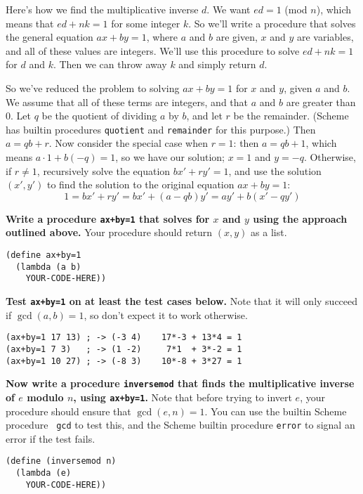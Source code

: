 Here's how we find the multiplicative inverse $d$.  We want $ed=1$
(mod $n$), which means that $ed + nk = 1$ for some integer $k$.  So
we'll write a procedure that solves the general equation $ax + by =
1$, where $a$ and $b$ are given, $x$ and $y$ are variables, and all of
these values are integers.  We'll use this procedure to solve $ed + nk
= 1$ for $d$ and $k$.  Then we can throw away $k$ and simply return
$d$.

So we've reduced the problem to solving $ax+by=1$ for $x$ and $y$,
given $a$ and $b$.  We assume that all of these terms are integers,
and that $a$ and $b$ are greater than 0.  Let $q$ be the quotient of
dividing $a$ by $b$, and let $r$ be the remainder.  (Scheme has
builtin procedures {\tt quotient} and {\tt remainder} for this
purpose.)  Then $a = qb + r$.  Now consider the special case when
$r=1$: then $a=qb+1$, which means $a \cdot 1 + b(-q)=1$, so we have
our solution; $x=1$ and $y=-q$.  Otherwise, if $r\neq 1$, recursively solve the equation
$bx'+ry'=1$, and use the solution $(x',y')$ to find the solution to
the original equation $ax+by=1$:
$$1 = bx' + ry' = bx' + (a-qb)y' = ay' + b(x'-qy')$$

{\bf Write a procedure {\tt ax+by=1} that solves for $x$ and $y$ using
  the approach outlined above.}  Your procedure should return $(x,y)$
as a list.

\begin{verbatim}
(define ax+by=1
  (lambda (a b)
    YOUR-CODE-HERE))
\end{verbatim}

{\bf Test {\tt ax+by=1} on at least the test cases below.}  Note that
it will only succeed if $\gcd(a,b)=1$, so don't expect it to work
otherwise.

\begin{verbatim}
(ax+by=1 17 13) ; -> (-3 4)    17*-3 + 13*4 = 1
(ax+by=1 7 3)   ; -> (1 -2)     7*1  + 3*-2 = 1
(ax+by=1 10 27) ; -> (-8 3)    10*-8 + 3*27 = 1
\end{verbatim}

{\bf Now write a procedure {\tt inversemod} that finds the
  multiplicative inverse of $e$ modulo $n$, using {\tt ax+by=1}.}
Note that before trying to invert $e$, your procedure should ensure
that $\gcd(e,n)=1$.  You can use the builtin Scheme procedure {\tt
  gcd} to test this, and the Scheme builtin procedure {\tt error} to
signal an error if the test fails.

\begin{verbatim}
(define (inversemod n)
  (lambda (e)
    YOUR-CODE-HERE))
\end{verbatim}

